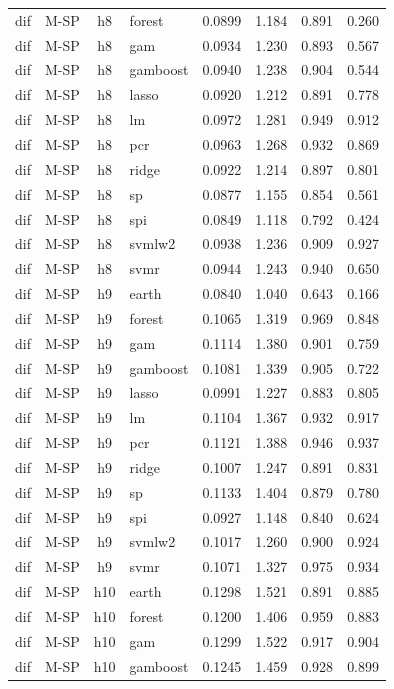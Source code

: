 \begin{ThreePartTable}
\begin{longtable}[t]{llclcccc}
dif & M-SP & h8 & forest & 0.0899 & 1.184 & 0.891 & 0.260\\
dif & M-SP & h8 & gam & 0.0934 & 1.230 & 0.893 & 0.567\\
dif & M-SP & h8 & gamboost & 0.0940 & 1.238 & 0.904 & 0.544\\
dif & M-SP & h8 & lasso & 0.0920 & 1.212 & 0.891 & 0.778\\
dif & M-SP & h8 & lm & 0.0972 & 1.281 & 0.949 & 0.912\\
dif & M-SP & h8 & pcr & 0.0963 & 1.268 & 0.932 & 0.869\\
dif & M-SP & h8 & ridge & 0.0922 & 1.214 & 0.897 & 0.801\\
dif & M-SP & h8 & sp & 0.0877 & 1.155 & 0.854 & 0.561\\
dif & M-SP & h8 & spi & 0.0849 & 1.118 & 0.792 & 0.424\\
dif & M-SP & h8 & svmlw2 & 0.0938 & 1.236 & 0.909 & 0.927\\
dif & M-SP & h8 & svmr & 0.0944 & 1.243 & 0.940 & 0.650\\
\addlinespace
dif & M-SP & h9 & earth & 0.0840 & 1.040 & 0.643 & 0.166\\
dif & M-SP & h9 & forest & 0.1065 & 1.319 & 0.969 & 0.848\\
dif & M-SP & h9 & gam & 0.1114 & 1.380 & 0.901 & 0.759\\
dif & M-SP & h9 & gamboost & 0.1081 & 1.339 & 0.905 & 0.722\\
dif & M-SP & h9 & lasso & 0.0991 & 1.227 & 0.883 & 0.805\\
dif & M-SP & h9 & lm & 0.1104 & 1.367 & 0.932 & 0.917\\
dif & M-SP & h9 & pcr & 0.1121 & 1.388 & 0.946 & 0.937\\
dif & M-SP & h9 & ridge & 0.1007 & 1.247 & 0.891 & 0.831\\
dif & M-SP & h9 & sp & 0.1133 & 1.404 & 0.879 & 0.780\\
dif & M-SP & h9 & spi & 0.0927 & 1.148 & 0.840 & 0.624\\
dif & M-SP & h9 & svmlw2 & 0.1017 & 1.260 & 0.900 & 0.924\\
dif & M-SP & h9 & svmr & 0.1071 & 1.327 & 0.975 & 0.934\\
\addlinespace
dif & M-SP & h10 & earth & 0.1298 & 1.521 & 0.891 & 0.885\\
dif & M-SP & h10 & forest & 0.1200 & 1.406 & 0.959 & 0.883\\
dif & M-SP & h10 & gam & 0.1299 & 1.522 & 0.917 & 0.904\\
dif & M-SP & h10 & gamboost & 0.1245 & 1.459 & 0.928 & 0.899\\

\end{longtable}
\end{ThreePartTable}

